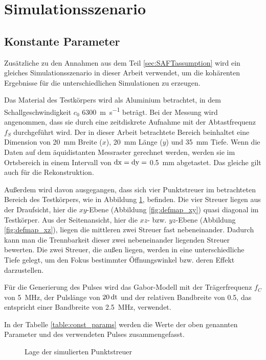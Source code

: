 \section{Simulationsszenario} \label{sec:params}

\subsection*{Konstante Parameter} %
Zusätzliche zu den Annahmen aus dem Teil \ref{sec:SAFTassumption} wird ein gleiches Simulationsszenario in dieser Arbeit verwendet, um die kohärenten Ergebnisse für die unterschiedlichen Simulationen zu erzeugen. \par
Das Material des Testkörpers wird als Aluminium betrachtet, in dem Schallgeschwindigkeit $c_{0}$ \SI{6300}{\metre \per \second} beträgt. Bei der Messung wird angenommen, dass sie durch eine zeitdiskrete Aufnahme mit der Abtastfrequenz $f_S$ durchgeführt wird. Der in dieser Arbeit betrachtete Bereich beinhaltet eine Dimension von \SI{20}{\milli \metre} Breite ($x$), \SI{20}{\milli \metre} Länge ($y$) und \SI{35}{\milli \metre} Tiefe. Wenn die Daten auf dem äquidistanten Messraster gerechnet werden, werden sie im Ortsbereich in einem Intervall von $\operatorname{dx} = \operatorname{dy} = $ \SI{0.5}{\milli \metre} abgetastet. Das gleiche gilt auch für die Rekonstruktion. \par
Außerdem wird davon ausgegangen, dass sich vier Punktstreuer im betrachteten Bereich des Testkörpers, wie in Abbildung \ref{fig:defmap}, befinden. Die vier Streuer liegen aus der Draufsicht, hier die $xy$-Ebene (Abbildung \ref{fig:defmap_xy}) quasi diagonal im Testkörper. Aus der Seitenansicht, hier die $xz$- bzw. $yz$-Ebene (Abbildung \ref{fig:defmap_xz}), liegen die mittleren zwei Streuer fast nebeneinander. Dadurch kann man die Trennbarkeit dieser zwei nebeneinander liegenden Streuer bewerten. Die zwei Streuer, die außen liegen, werden in eine unterschiedliche Tiefe gelegt, um den Fokus bestimmter Öffnungswinkel bzw. deren Effekt darzustellen. \par
Für die Generierung des Pulses wird das Gabor-Modell mit der Trägerfrequenz $f_C$ von \SI{5}{\mega \hertz}, der Pulslänge von $20 \operatorname{dt}$  und der relativen Bandbreite von 0.5, das entspricht einer Bandbreite von \SI{2.5}{\mega \hertz}, verwendet. \par
In der Tabelle \ref{table:const_params} werden die Werte der oben genannten Parameter und des verwendeten Pulses zusammengefasst. \par

\begin{figure}[h!]
\begin{center}

\caption{Lage der simulierten Punktstreuer}
\label{fig:defmap}
\end{center}
\end{figure}

